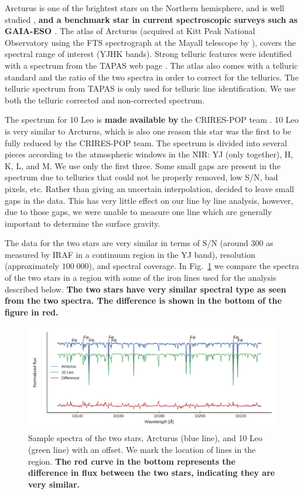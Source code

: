 \documentclass{aa}
\begin{document}
Arcturus is one of the brightest stars on the Northern hemisphere, and is well
studied \citep[see e.g.][to mention just a
few]{Griffin1967,McWilliam1990,Ramirez2013}, {\bf and a benchmark star in
current spectroscopic surveys such as GAIA-ESO \citep{Jofre2014,Smiljanic2014}}.
The atlas of Arcturus (acquired at Kitt Peak National Observatory using the FTS
spectrograph at the Mayall telescope by \citet{Hinkle1995a}), covers the
spectral range of interest (YJHK bands). Strong telluric features were
identified with a spectrum from the TAPAS web page \citep{Bertaux2014}. The
atlas also comes with a telluric standard and the ratio of the two spectra in
order to correct for the tellurics. The telluric spectrum from TAPAS is only
used for telluric line identification. We use both the telluric corrected and
non-corrected spectrum.

The spectrum for 10 Leo is {\bf made available by} the CRIRES-POP team
\citep{Nicholls2017}. 10 Leo is very similar to Arcturus, which is also one
reason this star was the first to be fully reduced by the CRIRES-POP team. The
spectrum is divided into several pieces according to the atmospheric windows in
the NIR: YJ (only together), H, K, L, and M. We use only the first three. Some
small gaps are present in the spectrum due to tellurics that could not be
properly removed, low S/N, bad pixels, etc. Rather than giving an uncertain
interpolation, \citet{Nicholls2017} decided to leave small gaps in the data.
This has very little effect on our line by line analysis, however, due to those
gaps, we were unable to measure one  line which are generally
important to determine the surface gravity.

The data for the two stars are very similar in terms of S/N (around 300 as
measured by IRAF in a continuum region in the YJ band), resolution
(approximately $100\;000$), and spectral coverage. In Fig.~\ref{fig:both} we
compare the spectra of the two stars in a region with some of the iron lines
used for the analysis described below. {\bf The two stars have very similar
spectral type as seen from the two spectra. The difference is shown in the
bottom of the figure in red.}

\begin{figure}[htpb!]
    \centering
    \includegraphics[width=1.0\linewidth]{figures/bothspectra.pdf}
    \caption{Sample spectra of the two stars, Arcturus (blue line), and 10 Leo
             (green line) with an offset. We mark the location of 
             lines in the region. {\bf The red curve in the bottom represents
             the difference in flux between the two stars, indicating they are
             very similar.}}
    \label{fig:both}
\end{figure}
\end{document}
